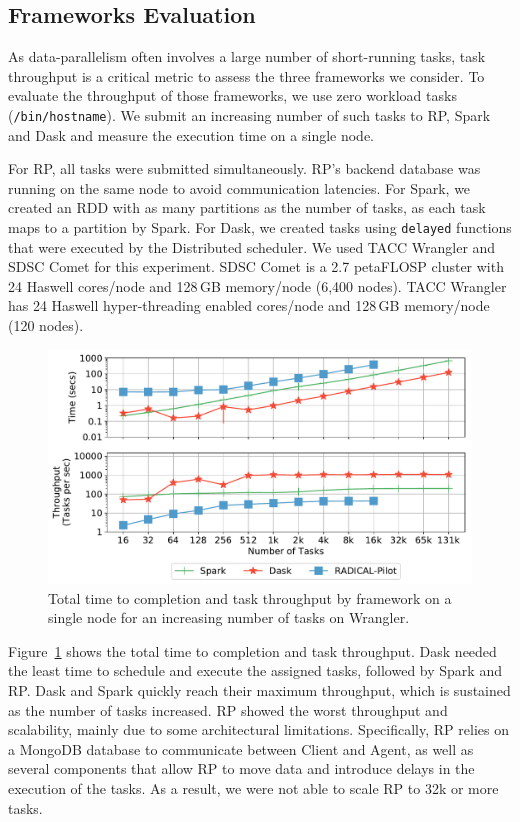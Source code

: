 \subsection{Frameworks Evaluation}
\label{sec:framework_eval}

As data-parallelism often involves a large number of short-running tasks, task
throughput is a critical metric to assess the three frameworks we consider. To
evaluate the throughput of those frameworks, we use zero workload tasks
(\texttt{/bin/hostname}). We submit an increasing number of such tasks to
RP, Spark and Dask and measure the execution time on a single node.

For RP, all tasks were submitted simultaneously. RP's
backend database was running on the same node to avoid communication
latencies. For Spark, we created an RDD with as many partitions as the number of
tasks, as each task maps to a partition by Spark. For Dask, we created tasks
using \texttt{delayed} functions that were executed by the Distributed
scheduler. We used TACC Wrangler and SDSC Comet for this experiment. SDSC Comet
is a 2.7 petaFLOSP cluster with 24 Haswell cores/node and 128\,GB memory/node
(6,400 nodes). TACC Wrangler has 24 Haswell hyper-threading enabled cores/node
and 128\,GB memory/node (120 nodes).

\begin{figure}[t]
    \centering
    \includegraphics[width=.75\textwidth]{figures/data_analytics_hpc/task_par/dask_spark_rp_wrangler.pdf}
    \caption{Total time to completion and task throughput by framework on a
    single node for an increasing number of tasks on Wrangler.}
    \label{fig:dask_spark_rp_wrangler}
\end{figure}

Figure~\ref{fig:dask_spark_rp_wrangler} shows the total time to completion and
task throughput. Dask needed the least time to schedule and execute the assigned
tasks, followed by Spark and RP. Dask and Spark quickly reach their
maximum throughput, which is sustained as the number of tasks increased.
RP showed the worst throughput and scalability, mainly due to some
architectural limitations. Specifically, RP relies on a MongoDB
database to communicate between Client and Agent, as well as several components
that allow RP to move data and introduce delays in the execution of
the tasks. As a result, we were not able to scale RP to 32k or more
tasks.

